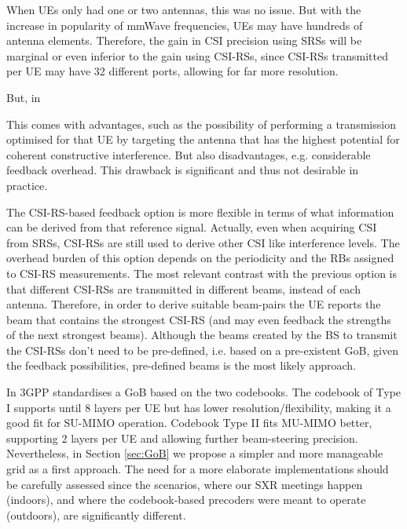 When UEs only had one or two antennas, this was no issue. But with the increase in popularity of mmWave frequencies, UEs may have hundreds of antenna elements. Therefore, the gain in CSI precision using SRSs will be marginal or even inferior to the gain using CSI-RSs, since CSI-RSs transmitted per UE may have 32 different ports, allowing for far more resolution. 

But, in 





This comes with advantages, such as the possibility of performing a transmission optimised for that UE by targeting the antenna that has the highest potential for coherent constructive interference. But also disadvantages, e.g. considerable feedback overhead. This drawback is significant and thus not desirable in practice.



The CSI-RS-based feedback option is more flexible in terms of what information can be derived from that reference signal. Actually, even when acquiring CSI from SRSs, CSI-RSs are still used to derive other CSI like interference levels. The overhead burden of this option depends on the periodicity and the \acp{RB} assigned to CSI-RS measurements. The most relevant contrast with the previous option is that different CSI-RSs are transmitted in different beams, instead of each antenna. Therefore, in order to derive suitable beam-pairs the UE reports the beam that contains the strongest CSI-RS (and may even feedback the strengths of the next strongest beams). Although the beams created by the BS to transmit the CSI-RSs don't need to be pre-defined, i.e. based on a pre-existent GoB, given the feedback possibilities, pre-defined beams is the most likely approach.


In \cite{3gpp-codebooks} 3GPP standardises a GoB based on the two codebooks. The codebook of Type I supports until 8 layers per UE but has lower resolution/flexibility, making it a good fit for SU-MIMO operation. Codebook Type II fits MU-MIMO better, supporting 2 layers per UE and allowing further beam-steering precision. 
Nevertheless, in Section \ref{sec:GoB} we propose a simpler and more manageable grid as a first approach. The need for a more elaborate implementations should be carefully assessed since the scenarios, where our SXR meetings happen (indoors), and where the codebook-based precoders were meant to operate (outdoors), are significantly different.





